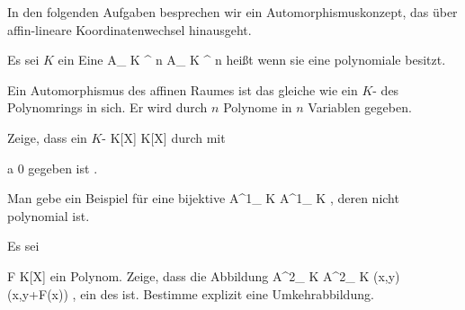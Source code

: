 In den folgenden Aufgaben besprechen wir ein Automorphismuskonzept, das über affin-lineare Koordinatenwechsel hinausgeht.







Es sei $K$ ein
Eine
\maabbdisp {\varphi} { { {\mathbb A}_{  K }^{  n   } } } { { {\mathbb A}_{  K }^{  n   } }
} {}
heißt
 {} {}
wenn sie eine polynomiale
besitzt.






Ein Automorphismus des affinen Raumes ist das gleiche wie ein
$K$-
des Polynomrings
 in sich. Er wird durch $n$ Polynome in $n$ Variablen gegeben.

{}
{





Zeige, dass ein
$K$-
\maabbdisp {\varphi} {K[X] } { K[X]
} {}
durch
 mit

\mavergleichskette
{\vergleichskette
{a
}
{ \neq }{ 0
}
{  }{
}
{    }{
}
{   }{
}
}
{}{}{}
gegeben ist
 {} {.}





}
{} {}

{}
{





Man gebe ein Beispiel für eine bijektive
\maabbdisp {} { {\mathbb A}^{1}_{ K } } { {\mathbb A}^{1}_{ K }
} {,}
deren
nicht polynomial ist.





}
{} {}

{}
{





Es sei

\mavergleichskette
{\vergleichskette
{ F
}
{ \in }{ K[X]
}
{  }{
}
{    }{
}
{   }{
}
}
{}{}{}
ein Polynom. Zeige, dass die Abbildung
\maabbeledisp {} { {\mathbb A}^{2}_{ K } } { {\mathbb A}^{2}_{ K }
} { (x,y) } { (x,y+F(x))
} {,}
ein
des
ist. Bestimme explizit eine Umkehrabbildung.





}
{} {}


